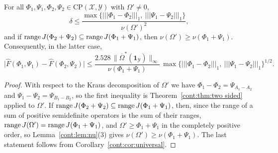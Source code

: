 \begin{corollary}\label{cont:cor:four maps cb}
For all $\Phi_1,\Psi_1,\Phi_2,\Psi_2\in\mathrm{CP}(\mathcal{X},\mathcal{Y})$ with $\Omega'\neq0$,
\[
\delta\leq\frac{\max\big\{|||\Phi_1-\Phi_2|||_1,\ |||\Psi_1-\Psi_2|||_1\big\}}{\nu(\Omega')^2},
\]
and if $\operatorname{range} J(\Phi_2+\Psi_2)\subseteq\operatorname{range} J(\Phi_1+\Psi_1)$, then $\nu(\Omega')\geq\nu(\Phi_1+\Psi_1)$. Consequently, in the latter case,
\[
\big|\widehat{F}(\Phi_1,\Psi_1)-\widehat{F}(\Phi_2,\Psi_2)\big|\leq\frac{2.528\,\|\overline{\Omega}^*(\mathbf{1}_{\mathcal{Y}})\|_\infty}{\nu(\Phi_1+\Psi_1)}\,\max\big\{|||\Phi_1-\Phi_2|||_1,\ |||\Psi_1-\Psi_2|||_1\big\}^{1/2}.
\]
\end{corollary}

\begin{proof}
With respect to the Kraus decomposition of $\Omega'$ we have $\Phi_1-\Phi_2=\Psi_{A_1-A_2}$ and $\Psi_1-\Psi_2=\Psi_{B_1-B_2}$, so the first inequality is Theorem~\ref{cont:thm:two sided} applied to $\Omega'$. If $\operatorname{range} J(\Phi_2+\Psi_2)\subseteq\operatorname{range} J(\Phi_1+\Psi_1)$, then, since the range of a sum of positive semidefinite operators is the sum of their ranges, $\operatorname{range} J(\Omega')=\operatorname{range} J(\Phi_1+\Psi_1)$, and $\Omega'\geq\Phi_1+\Psi_1$ in the completely positive order, so Lemma~\ref{cont:lem:nu}(3) gives $\nu(\Omega')\geq\nu(\Phi_1+\Psi_1)$. The last statement follows from Corollary~\ref{cont:cor:universal}.
\end{proof}

